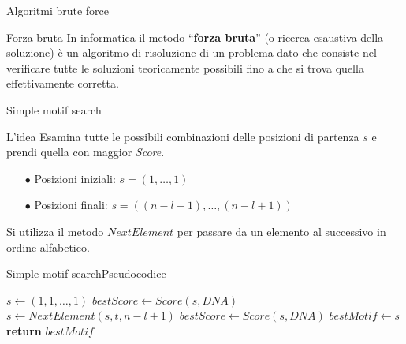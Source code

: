 	\begin{frame}{Algoritmi brute force}
		\begin{block}{Forza bruta}
			In informatica il metodo ``\alert{\textbf{forza bruta}}'' (o ricerca esaustiva della soluzione) è un algoritmo di risoluzione di un problema dato che consiste nel verificare tutte le soluzioni teoricamente possibili fino a che si trova quella effettivamente corretta.
		\end{block}
	\end{frame}
	
	\begin{frame}{Simple motif search}
		\begin{flushleft}
			\begin{block}{L'idea}
				Esamina tutte le possibili combinazioni delle posizioni di partenza $s$ e prendi quella con maggior \textit{Score}.
			\end{block}
		\end{flushleft}
		\pause
		\begin{flushleft}
			\begin{itemize}
				\item[$\bullet$] Posizioni iniziali: $s=(1,\dots,1)$
				\item[$\bullet$] Posizioni  finali: $s=((n-l+1),\dots,(n-l+1))$
			\end{itemize}
		\end{flushleft}
		\pause
		\begin{flushleft}
			Si utilizza il metodo $NextElement$ per passare da un elemento al successivo in ordine alfabetico.
		\end{flushleft}
	\end{frame}
	
	\begin{frame}{Simple motif search}{Pseudocodice}
		\begin{center}
			\begin{minipage}{7.7cm}
			    \begin{algorithmic}[1]
					    \State $s\gets (1,1,\dots,1)$
					    \State $bestScore\gets Score(s,DNA)$
					    	\State $s\gets NextElement(s,t,n-l+1)$
					    		\State $bestScore\gets Score(s,DNA)$
					    		\State $bestMotif\gets s$
					    	\EndIf
					    		\State \textbf{return} $bestMotif$
					    	\EndIf
					    \EndWhile
				    \EndProcedure
			    \end{algorithmic}
			\end{minipage}
	    \end{center}
	\end{frame}
	
